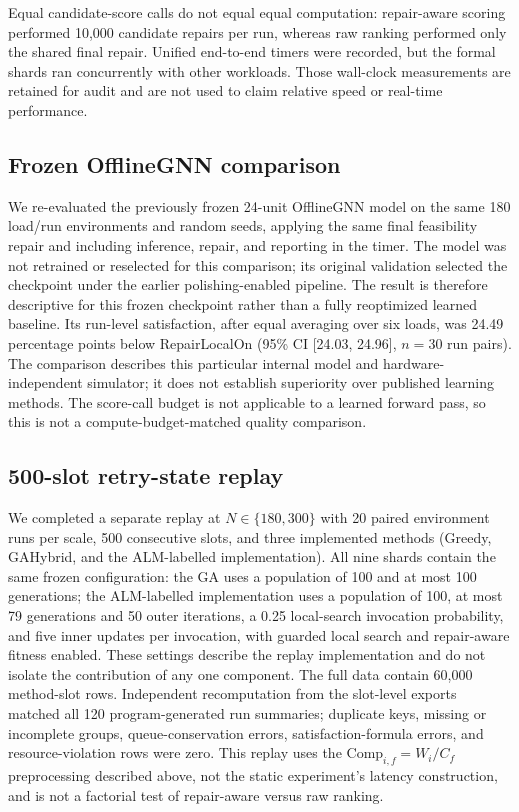 \documentclass[pdflatex,sn-mathphys-num]{sn-jnl}
\begin{document}
Equal candidate-score calls do not equal equal computation: repair-aware scoring performed 10,000 candidate repairs per run, whereas raw ranking performed only the shared final repair. Unified end-to-end timers were recorded, but the formal shards ran concurrently with other workloads. Those wall-clock measurements are retained for audit and are not used to claim relative speed or real-time performance.

\subsection{Frozen OfflineGNN comparison}
We re-evaluated the previously frozen 24-unit OfflineGNN model on the same 180 load/run environments and random seeds, applying the same final feasibility repair and including inference, repair, and reporting in the timer. The model was not retrained or reselected for this comparison; its original validation selected the checkpoint under the earlier polishing-enabled pipeline. The result is therefore descriptive for this frozen checkpoint rather than a fully reoptimized learned baseline. Its run-level satisfaction, after equal averaging over six loads, was 24.49 percentage points below RepairLocalOn (95\% CI [24.03, 24.96], $n=30$ run pairs). The comparison describes this particular internal model and hardware-independent simulator; it does not establish superiority over published learning methods. The score-call budget is not applicable to a learned forward pass, so this is not a compute-budget-matched quality comparison.

\subsection{500-slot retry-state replay}
We completed a separate replay at $N\in\{180,300\}$ with 20 paired environment runs per scale, 500 consecutive slots, and three implemented methods (Greedy, GAHybrid, and the ALM-labelled implementation). All nine shards contain the same frozen configuration: the GA uses a population of 100 and at most 100 generations; the ALM-labelled implementation uses a population of 100, at most 79 generations and 50 outer iterations, a 0.25 local-search invocation probability, and five inner updates per invocation, with guarded local search and repair-aware fitness enabled. These settings describe the replay implementation and do not isolate the contribution of any one component. The full data contain 60,000 method-slot rows. Independent recomputation from the slot-level exports matched all 120 program-generated run summaries; duplicate keys, missing or incomplete groups, queue-conservation errors, satisfaction-formula errors, and resource-violation rows were zero. This replay uses the $\mathrm{Comp}_{i,f}=W_i/C_f$ preprocessing described above, not the static experiment's latency construction, and is not a factorial test of repair-aware versus raw ranking.
\end{document}

